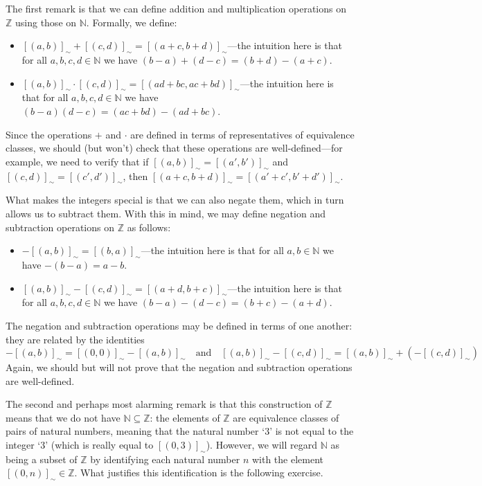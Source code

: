 The first remark is that we can define addition and multiplication operations on $\mathbb{Z}$ using those on $\mathbb{N}$. Formally, we define:
\begin{itemize}
\item $[(a,b)]_{\sim} + [(c,d)]_{\sim} = [(a+c, b+d)]_{\sim}$---the intuition here is that for all $a,b,c,d \in \mathbb{N}$ we have $(b-a) + (d-c) = (b+d) - (a+c)$.
\item $[(a,b)]_{\sim} \cdot [(c,d)]_{\sim} = [(ad+bc, ac+bd)]_{\sim}$---the intuition here is that for all $a,b,c,d \in \mathbb{N}$ we have $(b-a)(d-c) = (ac+bd) - (ad+bc)$.
\end{itemize}
Since the operations $+$ and $\cdot$ are defined in terms of representatives of equivalence classes, we should (but won't) check that these operations are well-defined---for example, we need to verify that if $[(a,b)]_{\sim} = [(a',b')]_{\sim}$ and $[(c,d)]_{\sim} = [(c',d')]_{\sim}$, then $[(a+c,b+d)]_{\sim} = [(a'+c',b'+d')]_{\sim}$.

What makes the integers special is that we can also negate them, which in turn allows us to subtract them. With this in mind, we may define negation and subtraction operations on $\mathbb{Z}$ as follows:
\begin{itemize}
\item $-[(a,b)]_{\sim} = [(b,a)]_{\sim}$---the intuition here is that for all $a,b \in \mathbb{N}$ we have $-(b-a) = a-b$.
\item $[(a,b)]_{\sim} - [(c,d)]_{\sim} = [(a+d,b+c)]_{\sim}$---the intuition here is that for all $a,b,c,d \in \mathbb{N}$ we have $(b-a) - (d-c) = (b+c) - (a+d)$.
\end{itemize}
The negation and subtraction operations may be defined in terms of one another: they are related by the identities
\[ -[(a,b)]_{\sim} = [(0,0)]_{\sim} - [(a,b)]_{\sim} \quad \text{and} \quad [(a,b)]_{\sim} - [(c,d)]_{\sim} = [(a,b)]_{\sim} + (-[(c,d)]_{\sim}) \]
Again, we should but will not prove that the negation and subtraction operations are well-defined.

The second and perhaps most alarming remark is that this construction of $\mathbb{Z}$ means that we do not have $\mathbb{N} \subseteq \mathbb{Z}$: the elements of $\mathbb{Z}$ are equivalence classes of pairs of natural numbers, meaning that the natural number `$3$' is not equal to the integer `$3$' (which is really equal to $[(0,3)]_{\sim}$). However, we will regard $\mathbb{N}$ as being a subset of $\mathbb{Z}$ by identifying each natural number $n$ with the element $[(0,n)]_{\sim} \in \mathbb{Z}$. What justifies this identification is the following exercise.

